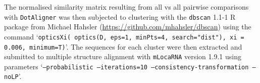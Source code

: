 \documentclass{bmcart}
\newcommand\dotaligner{\texttt{DotAligner}}
\begin{document}
The normalised similarity matrix resulting from all vs all pairwise comparisons with \dotaligner{} was then 
subjected to clustering with the \texttt{dbscan} 1.1-1 R package from Michael Hahsler (\url{https://github.com/mhahsler/dbscan}) using the command `\texttt{opticsXi( optics(D, eps=1, minPts=4, search="dist"), xi = 0.006, minimum=T)}'. The sequences for each cluster were then extracted and submitted to multiple structure alignment with \texttt{mLocaRNA} version 1.9.1 using parameters  `\texttt{--probabilistic --iterations=10  --consistency-transformation --noLP}'.\\
 

\end{document}
